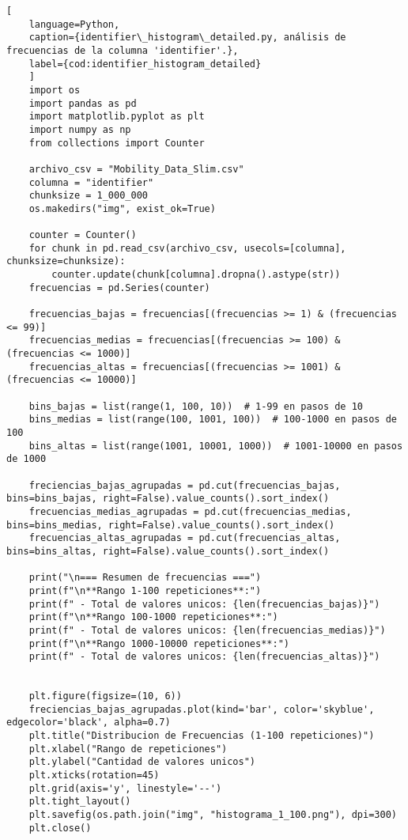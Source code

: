 \begin{lstlisting}[
    language=Python,
    caption={identifier\_histogram\_detailed.py, análisis de frecuencias de la columna 'identifier'.},
    label={cod:identifier_histogram_detailed}
    ]
    import os
    import pandas as pd
    import matplotlib.pyplot as plt
    import numpy as np
    from collections import Counter

    archivo_csv = "Mobility_Data_Slim.csv"
    columna = "identifier"  
    chunksize = 1_000_000  
    os.makedirs("img", exist_ok=True)

    counter = Counter()
    for chunk in pd.read_csv(archivo_csv, usecols=[columna], chunksize=chunksize):
        counter.update(chunk[columna].dropna().astype(str))
    frecuencias = pd.Series(counter)

    frecuencias_bajas = frecuencias[(frecuencias >= 1) & (frecuencias <= 99)]
    frecuencias_medias = frecuencias[(frecuencias >= 100) & (frecuencias <= 1000)]
    frecuencias_altas = frecuencias[(frecuencias >= 1001) & (frecuencias <= 10000)]

    bins_bajas = list(range(1, 100, 10))  # 1-99 en pasos de 10 
    bins_medias = list(range(100, 1001, 100))  # 100-1000 en pasos de 100
    bins_altas = list(range(1001, 10001, 1000))  # 1001-10000 en pasos de 1000

    freciencias_bajas_agrupadas = pd.cut(frecuencias_bajas, bins=bins_bajas, right=False).value_counts().sort_index()
    frecuencias_medias_agrupadas = pd.cut(frecuencias_medias, bins=bins_medias, right=False).value_counts().sort_index()
    frecuencias_altas_agrupadas = pd.cut(frecuencias_altas, bins=bins_altas, right=False).value_counts().sort_index()

    print("\n=== Resumen de frecuencias ===")
    print(f"\n**Rango 1-100 repeticiones**:")
    print(f" - Total de valores unicos: {len(frecuencias_bajas)}")
    print(f"\n**Rango 100-1000 repeticiones**:")
    print(f" - Total de valores unicos: {len(frecuencias_medias)}")
    print(f"\n**Rango 1000-10000 repeticiones**:")
    print(f" - Total de valores unicos: {len(frecuencias_altas)}")


    plt.figure(figsize=(10, 6))
    freciencias_bajas_agrupadas.plot(kind='bar', color='skyblue', edgecolor='black', alpha=0.7)
    plt.title("Distribucion de Frecuencias (1-100 repeticiones)")
    plt.xlabel("Rango de repeticiones")
    plt.ylabel("Cantidad de valores unicos")
    plt.xticks(rotation=45)
    plt.grid(axis='y', linestyle='--')
    plt.tight_layout()
    plt.savefig(os.path.join("img", "histograma_1_100.png"), dpi=300)
    plt.close()


\end{lstlisting}

